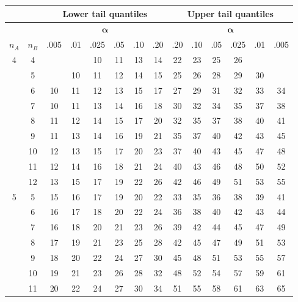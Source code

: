 
\begin{center}
  
  \begin{tabular}[t]{|c|c|*{6}{c}|*{6}{c}|}
  \multicolumn{2}{c}{}
  &
  \multicolumn{6}{c}{\textbf{Lower tail quantiles}}
  &
  \multicolumn{6}{c}{\textbf{Upper tail quantiles}}
  \\
  \hline
  &
  &
  \multicolumn{6}{|c}{$\mathbf{\alpha}$}
  &
  \multicolumn{6}{|c|}{$\mathbf{\alpha}$} \\
  $n_A$ & $n_B$ 
          &.005 &.01  &.025 & .05 & .10 & .20 & .20 & .10 & .05 &.025 & .01 &.005 \\
  \hline
   4 &  4 &     &     &  10 &  11 &  13 &  14 &  22 &  23 &  25 &  26 &     &     \\
     &  5 &     &  10 &  11 &  12 &  14 &  15 &  25 &  26 &  28 &  29 &  30 &     \\
     &  6 &  10 &  11 &  12 &  13 &  15 &  17 &  27 &  29 &  31 &  32 &  33 &  34 \\
     &  7 &  10 &  11 &  13 &  14 &  16 &  18 &  30 &  32 &  34 &  35 &  37 &  38 \\
     &  8 &  11 &  12 &  14 &  15 &  17 &  20 &  32 &  35 &  37 &  38 &  40 &  41 \\
     &  9 &  11 &  13 &  14 &  16 &  19 &  21 &  35 &  37 &  40 &  42 &  43 &  45 \\
     & 10 &  12 &  13 &  15 &  17 &  20 &  23 &  37 &  40 &  43 &  45 &  47 &  48 \\
     & 11 &  12 &  14 &  16 &  18 &  21 &  24 &  40 &  43 &  46 &  48 &  50 &  52 \\
     & 12 &  13 &  15 &  17 &  19 &  22 &  26 &  42 &  46 &  49 &  51 &  53 &  55 \\
  \hline
   5 &  5 &  15 &  16 &  17 &  19 &  20 &  22 &  33 &  35 &  36 &  38 &  39 &  41 \\
     &  6 &  16 &  17 &  18 &  20 &  22 &  24 &  36 &  38 &  40 &  42 &  43 &  44 \\
     &  7 &  16 &  18 &  20 &  21 &  23 &  26 &  39 &  42 &  44 &  45 &  47 &  49 \\
     &  8 &  17 &  19 &  21 &  23 &  25 &  28 &  42 &  45 &  47 &  49 &  51 &  53 \\
     &  9 &  18 &  20 &  22 &  24 &  27 &  30 &  45 &  48 &  51 &  53 &  55 &  57 \\
     & 10 &  19 &  21 &  23 &  26 &  28 &  32 &  48 &  52 &  54 &  57 &  59 &  61 \\
     & 11 &  20 &  22 &  24 &  27 &  30 &  34 &  51 &  55 &  58 &  61 &  63 &  65 \\

\end{tabular}
\end{center}
